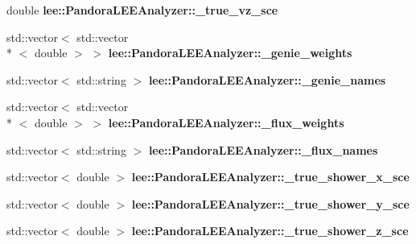 \begin{DoxyCompactItemize}
\item 
\hypertarget{group__lee_ga5ac99bc027e85044950f2f502d3fffb0}{double {\bfseries lee\-::\-Pandora\-L\-E\-E\-Analyzer\-::\-\_\-true\-\_\-vz\-\_\-sce}}\label{group__lee_ga5ac99bc027e85044950f2f502d3fffb0}

\item 
\hypertarget{group__lee_ga3eb5462acc7e7edfc80bd09ad295c204}{std\-::vector$<$ std\-::vector\\*
$<$ double $>$ $>$ {\bfseries lee\-::\-Pandora\-L\-E\-E\-Analyzer\-::\-\_\-genie\-\_\-weights}}\label{group__lee_ga3eb5462acc7e7edfc80bd09ad295c204}

\item 
\hypertarget{group__lee_ga5b5cd813f9ff0640d8092ea2d95d471d}{std\-::vector$<$ std\-::string $>$ {\bfseries lee\-::\-Pandora\-L\-E\-E\-Analyzer\-::\-\_\-genie\-\_\-names}}\label{group__lee_ga5b5cd813f9ff0640d8092ea2d95d471d}

\item 
\hypertarget{group__lee_gac9f0d1755238cd8e918d86fb7b35e0e0}{std\-::vector$<$ std\-::vector\\*
$<$ double $>$ $>$ {\bfseries lee\-::\-Pandora\-L\-E\-E\-Analyzer\-::\-\_\-flux\-\_\-weights}}\label{group__lee_gac9f0d1755238cd8e918d86fb7b35e0e0}

\item 
\hypertarget{group__lee_ga2ffedfa5cf2298c49bb2aa602ba5b66b}{std\-::vector$<$ std\-::string $>$ {\bfseries lee\-::\-Pandora\-L\-E\-E\-Analyzer\-::\-\_\-flux\-\_\-names}}\label{group__lee_ga2ffedfa5cf2298c49bb2aa602ba5b66b}

\item 
\hypertarget{group__lee_ga5a4c4d805d124adaddb51a03be0af692}{std\-::vector$<$ double $>$ {\bfseries lee\-::\-Pandora\-L\-E\-E\-Analyzer\-::\-\_\-true\-\_\-shower\-\_\-x\-\_\-sce}}\label{group__lee_ga5a4c4d805d124adaddb51a03be0af692}

\item 
\hypertarget{group__lee_ga2509960b89cf002d160e0c298575eafd}{std\-::vector$<$ double $>$ {\bfseries lee\-::\-Pandora\-L\-E\-E\-Analyzer\-::\-\_\-true\-\_\-shower\-\_\-y\-\_\-sce}}\label{group__lee_ga2509960b89cf002d160e0c298575eafd}

\item 
\hypertarget{group__lee_gacb0f3d491c4acf888d0a787624627b57}{std\-::vector$<$ double $>$ {\bfseries lee\-::\-Pandora\-L\-E\-E\-Analyzer\-::\-\_\-true\-\_\-shower\-\_\-z\-\_\-sce}}\label{group__lee_gacb0f3d491c4acf888d0a787624627b57}


\end{DoxyCompactItemize}
